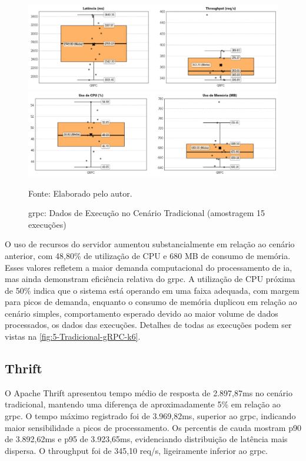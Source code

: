 \begin{figure}[H]
    \caption{\acrshort{grpc}: Dados de Execução no Cenário Tradicional (amostragem 15 execuções)}
    \label{fig:5-Tradicional-gRPC-k6}
    \centering
    \includegraphics[width=1\linewidth]{imagens//resultados/5-resultados-Tradicional-gRPC-k6.png}
    \includegraphics[width=1\linewidth]{imagens//resultados/5-resultados-Tradicional-gRPC-prometheus.png}    
    {\par \raggedright \footnotesize Fonte: Elaborado pelo autor.\par}
\end{figure}


O uso de recursos do servidor aumentou substancialmente em relação ao cenário anterior, com 48,80\% de utilização de CPU e 680 MB de consumo de memória. Esses valores refletem a maior demanda computacional do processamento de \gls{ia}, mas ainda demonstram eficiência relativa do \gls{grpc}. A utilização de CPU próxima de 50\% indica que o sistema está operando em uma faixa adequada, com margem para picos de demanda, enquanto o consumo de memória duplicou em relação ao cenário simples, comportamento esperado devido ao maior volume de dados processados, os dados das execuções. Detalhes de todas as execuções podem ser vistas na  \autoref{fig:5-Tradicional-gRPC-k6}.

\subsection{Thrift}

O Apache Thrift apresentou tempo médio de resposta de 2.897,87ms no cenário tradicional, mantendo uma diferença de aproximadamente 5\% em relação ao \gls{grpc}. O tempo máximo registrado foi de 3.969,82ms, superior ao \gls{grpc}, indicando maior sensibilidade a picos de processamento. Os percentis de cauda mostram p90 de 3.892,62ms e p95 de 3.923,65ms, evidenciando distribuição de latência mais dispersa. O throughput foi de 345,10 req/s, ligeiramente inferior ao \gls{grpc}.

